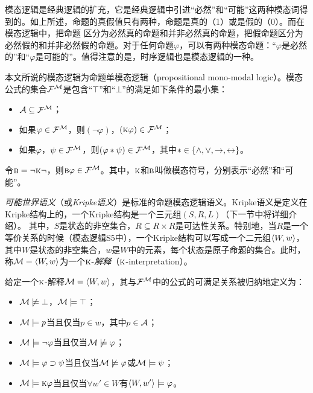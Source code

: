 模态逻辑是经典逻辑的扩充，它是经典逻辑中引进“必然”和“可能”这两种模态词得到的。如上所述，命题的真假值只有两种，命题是真的（1）或是假的（0）。而在模态逻辑中，把命题
区分为必然真的命题和并非必然真的命题，把假命题区分为必然假的和并非必然假的命题。对于任何命题$\varphi$，可以有两种模态命题：“$\varphi$是必然的”和“$\varphi$是可能的”。值得注意的是，时序逻辑也是模态逻辑的一种。

本文所说的模态逻辑为命题单模态逻辑（propositional mono-modal logic）。模态公式的集合${\cal F}^{{\cal M}}$是包含“$\top$”和“$\bot$”的满足如下条件的最小集：
\begin{itemize}
	\item ${\cal A} \subseteq {\cal F}^{{\cal M}}$；
	\item 如果$\varphi \in {\cal F}^{{\cal M}}$，则$(\neg \varphi)$，$(\textsc{k} \varphi)\in {\cal F}^{{\cal M}}$；
	\item 如果$\varphi$，$\psi\in {\cal F}^{{\cal M}}$，则$(\varphi * \psi)\in {\cal F}^{{\cal M}}$，其中$*\in \{\wedge,\vee, \rightarrow, \leftrightarrow\}$。
\end{itemize}
令$\textsc{b} = \neg \textsc{k} \neg$，则$\textsc{b} \varphi \in {\cal F}^{{\cal M}}$。其中，$\textsc{k}$和$\textsc{b}$叫做模态符号，分别表示“必然”和“可能”。

\emph{可能世界语义}（或\emph{Kripke语义}）是标准的命题模态逻辑语义\cite{kripke1963semantical}。Kripke语义是定义在Kripke结构上的，一个Kripke结构是一个三元组$(S,R,L)$（下一节中将详细介绍）。
其中，$S$是状态的非空集合，$R\subseteq R \times R$是可达性关系。特别地，当$R$是一个等价关系的时候（模态逻辑S5中），一个Kripke结构可以写成一个二元组${\langle{W,w}\rangle}$，其中$W$是状态的非空集合，$w$是$W$中的元素，每个状态是原子命题的集合。此时，称${\cal M}={\langle{W,w}\rangle}$为一个$\textsc{k}$-\emph{解释}（$\textsc{k}$-interpretation）\cite{zhang2009knowledge}。

\begin{definition}\label{def:s5:interp}
	给定一个$\textsc{k}$-解释${\cal M}={\langle{W,w}\rangle}$，其与${\cal F}^{{\cal M}}$中的公式的可满足关系被归纳地定义为：
	\begin{itemize}
		\item ${\cal M} \not \models \bot$，${\cal M} \models \top$；
		\item ${\cal M} \models p$当且仅当$p\in w$，其中$p\in {\cal A}$；
		\item ${\cal M} \models \neg \varphi$当且仅当${\cal M} \not \models \varphi$；
		\item ${\cal M} \models \varphi \supset \psi$当且仅当${\cal M} \not \models \varphi$或${\cal M} \models \psi$；
		\item ${\cal M} \models \textsc{k} \varphi$当且仅当$\forall w'\in W$有${\langle{W, w'}\rangle}\models \varphi$。
	\end{itemize}
\end{definition}

